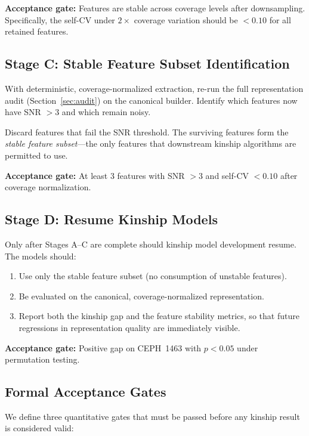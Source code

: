 \documentclass{../yalumba}
\begin{document}
\textbf{Acceptance gate:} Features are stable across coverage levels after
downsampling. Specifically, the self-CV under $2\times$ coverage variation
should be $< 0.10$ for all retained features.

\subsection{Stage C: Stable Feature Subset Identification}

With deterministic, coverage-normalized extraction, re-run the full
representation audit (Section~\ref{sec:audit}) on the canonical builder.
Identify which features now have SNR $> 3$ and which remain noisy.

Discard features that fail the SNR threshold. The surviving features form the
\textit{stable feature subset}---the only features that downstream kinship
algorithms are permitted to use.

\textbf{Acceptance gate:} At least 3 features with SNR $> 3$ and self-CV
$< 0.10$ after coverage normalization.

\subsection{Stage D: Resume Kinship Models}

Only after Stages A--C are complete should kinship model development resume.
The models should:
\begin{enumerate}[leftmargin=2em]
  \item Use only the stable feature subset (no consumption of unstable features).
  \item Be evaluated on the canonical, coverage-normalized representation.
  \item Report both the kinship gap and the feature stability metrics, so that
    future regressions in representation quality are immediately visible.
\end{enumerate}

\textbf{Acceptance gate:} Positive gap on CEPH~1463 with $p < 0.05$ under
permutation testing.

\subsection{Formal Acceptance Gates}

We define three quantitative gates that must be passed before any kinship
result is considered valid:
\end{document}

